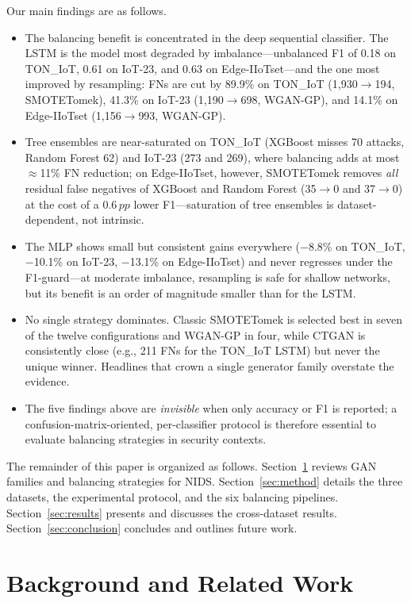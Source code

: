 ﻿\documentclass[journal]{IEEEtran}
\begin{document}
Our main findings are as follows.
\begin{itemize}
\item The balancing benefit is concentrated in the deep sequential classifier. The LSTM is the model most degraded by imbalance---unbalanced F1 of 0.18 on TON\_IoT, 0.61 on IoT-23, and 0.63 on Edge-IIoTset---and the one most improved by resampling: FNs are cut by 89.9\% on TON\_IoT (1{,}930$\rightarrow$194, SMOTETomek), 41.3\% on IoT-23 (1{,}190$\rightarrow$698, WGAN-GP), and 14.1\% on Edge-IIoTset (1{,}156$\rightarrow$993, WGAN-GP).
\item Tree ensembles are near-saturated on TON\_IoT (XGBoost misses 70 attacks, Random Forest 62) and IoT-23 (273 and 269), where balancing adds at most $\approx$11\% FN reduction; on Edge-IIoTset, however, SMOTETomek removes \emph{all} residual false negatives of XGBoost and Random Forest (35$\rightarrow$0 and 37$\rightarrow$0) at the cost of a 0.6\,$pp$ lower F1---saturation of tree ensembles is dataset-dependent, not intrinsic.
\item The MLP shows small but consistent gains everywhere ($-$8.8\% on TON\_IoT, $-$10.1\% on IoT-23, $-$13.1\% on Edge-IIoTset) and never regresses under the F1-guard---at moderate imbalance, resampling is safe for shallow networks, but its benefit is an order of magnitude smaller than for the LSTM.
\item No single strategy dominates. Classic SMOTETomek is selected best in seven of the twelve configurations and WGAN-GP in four, while CTGAN is consistently close (e.g., 211 FNs for the TON\_IoT LSTM) but never the unique winner. Headlines that crown a single generator family overstate the evidence.
\item The five findings above are \emph{invisible} when only accuracy or F1 is reported; a confusion-matrix-oriented, per-classifier protocol is therefore essential to evaluate balancing strategies in security contexts.
\end{itemize}

The remainder of this paper is organized as follows. Section~\ref{sec:bg} reviews GAN families and balancing strategies for NIDS. Section~\ref{sec:method} details the three datasets, the experimental protocol, and the six balancing pipelines. Section~\ref{sec:results} presents and discusses the cross-dataset results. Section~\ref{sec:conclusion} concludes and outlines future work.

\section{Background and Related Work}
\label{sec:bg}
\end{document}
